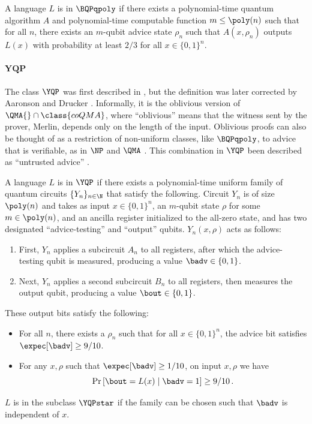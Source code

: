 \documentclass{toc}
\begin{document}
\begin{definition}
	A language $L$ is in $\BQPqpoly$ if there exists a polynomial-time quantum algorithm $A$
	and polynomial-time computable function $m\leq \poly(n)$ such that for all $n$,
	there exists an $m$-qubit advice state $\rho_n$ such that $A(x,\rho_n)$ outputs $L(x)$
	with probability at least $2/3$ for all $x\in\{0,1\}^n$.
\end{definition}



\paragraph{\texorpdfstring{$\mathsf{\mathbf{YQP}}$}{YQP}}
The class $\YQP$ was first described in \cite{aaronson2007learnability},
but the definition was later corrected by Aaronson and Drucker \cite{aaronson2014full}.
Informally, it is the oblivious version of $\QMA{}\cap\class{coQMA}$,
where ``oblivious''
means that the witness sent by the prover, Merlin, depends only on the length of the input.
Oblivious proofs can also be thought of as a restriction of non-uniform classes, like $\BQPqpoly$,
to advice that is verifiable, as in $\NP$ and $\QMA$ \cite{goldreich2015input}.
This combination in $\YQP$ been described as
``untrusted advice'' \cite{aaronson2007learnability}.



\begin{definition}\label{def:YQP}
	A language $L$ is in $\YQP$ if there exists a polynomial-time uniform family of
	quantum circuits $\{Y_n\}_{n\in \N}$ that satisfy the following.
	Circuit $Y_n$ is of size $\poly(n)$ and takes as input
	$x\in \{0,1\}^n$, an $m$-qubit state $\rho$ for some $m\in \poly(n)$,
	and an ancilla register initialized to the all-zero state,
	and has two designated ``advice-testing'' and ``output'' qubits.
	$Y_n(x,\rho)$ acts as follows:
	\begin{enumerate}
		\item First, $Y_n$ applies a subcircuit $A_n$ to all registers, after which
		the advice-testing qubit is measured, producing a value $\badv\in\{0,1\}$.
		\item Next, $Y_n$ applies a second subcircuit $B_n$ to all registers,
		then measures the output qubit, producing a value $\bout\in\{0,1\}$.
	\end{enumerate}
	These output bits satisfy the following:
	\begin{itemize}
		\item For all $n$, there exists a $\rho_n$ such that for all $x \in \{0,1\}^n$,
		the advice bit satisfies $\expec[\badv] \geq 9/10$.
		\item For any $x,\rho$ such that $\expec[\badv]\geq 1/10$,
		on input $x,\rho$ we have
		\[
		\Pr\left[\bout = L(x) \mid \badv = 1\right] \geq 9/10 \, .
		\]
	\end{itemize}
	$L$ is in the subclass $\YQPstar$ if the family can be chosen such that
	$\badv$ is independent of $x$.
\end{definition}
\end{document}
